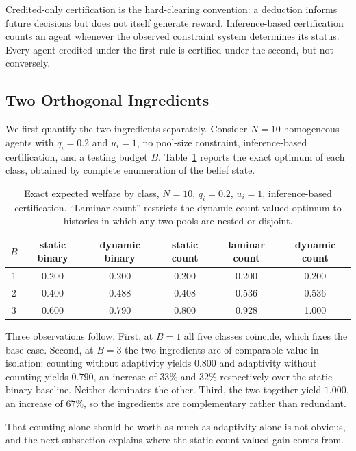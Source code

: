 Credited-only certification is the hard-clearing convention: a deduction informs
future decisions but does not itself generate reward. Inference-based
certification counts an agent whenever the observed constraint system determines
its status. Every agent credited under the first rule is certified under the
second, but not conversely.

\subsection{Two Orthogonal Ingredients}
\label{sec:anatomy-ladder}

We first quantify the two ingredients separately. Consider $N=10$ homogeneous
agents with $q_i=0.2$ and $u_i=1$, no pool-size constraint, inference-based
certification, and a testing budget $B$. Table~\ref{tab:ladder} reports the exact
optimum of each class, obtained by complete enumeration of the belief state.

\begin{table}[h]
\centering
\begin{tabular}{cccccc}
\toprule
$B$ & static binary & dynamic binary & static count & laminar count & dynamic count \\
\midrule
1 & 0.200 & 0.200 & 0.200 & 0.200 & 0.200 \\
2 & 0.400 & 0.488 & 0.408 & 0.536 & 0.536 \\
3 & 0.600 & 0.790 & 0.800 & 0.928 & 1.000 \\
\bottomrule
\end{tabular}
\caption{Exact expected welfare by class, $N=10$, $q_i=0.2$, $u_i=1$,
inference-based certification. ``Laminar count'' restricts the dynamic
count-valued optimum to histories in which any two pools are nested or
disjoint.}
\label{tab:ladder}
\end{table}

Three observations follow. First, at $B=1$ all five classes coincide, which fixes
the base case. Second, at $B=3$ the two ingredients are of comparable value in
isolation: counting without adaptivity yields $0.800$ and adaptivity without
counting yields $0.790$, an increase of $33\%$ and $32\%$ respectively over the
static binary baseline. Neither dominates the other. Third, the two together
yield $1.000$, an increase of $67\%$, so the ingredients are complementary rather
than redundant.

That counting alone should be worth as much as adaptivity alone is not obvious,
and the next subsection explains where the static count-valued gain comes from.

